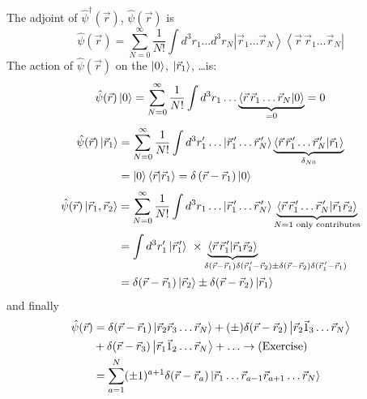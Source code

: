 \documentclass[12pt]{article}
\newcommand{\be}{\begin{equation}}
\newcommand{\ee}{\end{equation}}
\begin{document}
The adjoint of $\hat{\psi}^\dagger(\vec{r})$, $\hat{\psi}(\vec{r})$ is
\be
\hat{\psi}(\vec{r})=\sum_{N=0}^{\infty} \frac{1}{N !} \int d^{3} r_{1} \ldots d^{3} r_{N}\left|\vec{r}_{1} \ldots \vec{r}_{N}\right\rangle\left\langle\vec{r}\,\vec{r}_{1} \ldots \vec{r}_{N}\right|
\label{eq:g37}
\ee
The action of $\hat{\psi}(\vec{r})$ on the $\ket{0}$, $\ket{\vec{r}_1}$, \ldots is:
\be
\hat{\psi}(\vec{r})\ket{0} = \sum_{N=0}^{\infty} \frac{1}{N !} \int d^{3} r_{1}\ldots \underbrace{\bra{\vec{r}\,\vec{r}_1\ldots\vec{r}_N}\ket{0}}_{=0} = 0
\ee
%
\be
\begin{aligned}
\hat{\psi}(\vec{r})\ket{\vec{r}_1}
& =\sum_{N=0}^{\infty} \frac{1}{N !} \int d^{3} r_{1}^\prime\ldots
\ket{\vec{r}_1^{\,\prime}\ldots\vec{r}_N^{\,\prime}}
\underbrace{\bra{\vec{r}\,\vec{r}_1^{\,\prime}\ldots\vec{r}_N^{\,\prime}}\ket{\vec{r}_1}}_{\delta_{N0}}\\
&= \ket{0}\bra{\vec{r}}\ket{\vec{r}_1} = \delta\left(\vec{r}-\vec{r}_{1}\right)\ket{0}
\end{aligned}
\ee
\be
\begin{aligned}
\hat{\psi}(\vec{r})\ket{\vec{r}_1,\vec{r}_2}
& =\sum_{N=0}^{\infty} \frac{1}{N !} \int d^{3} r_{1}\ldots
\ket{\vec{r}_1^{\,\prime}\ldots\vec{r}_N^{\,\prime}}
\underbrace{\bra{\vec{r}\,\vec{r}_1^{\,\prime}\ldots\vec{r}_N^{\,\prime}}\ket{\vec{r}_1\vec{r}_2}}_{N=1\text{ only contributes}}\\
&= \int d^{3} r_{1}^\prime \ket{\vec{r}_1^{\,\prime}} \,\, \times
\underbrace{\bra{\vec{r}\,\vec{r}_1^{\,\prime}}\ket{\vec{r}_1\vec{r}_2}}%
_{\mathrlap{\delta(\vec{r}-\vec{r}_1)\delta(\vec{r}_1^{\,\prime}-\vec{r}_2) \pm \delta(\vec{r}-\vec{r}_2)\delta(\vec{r}_1^{\,\prime}-\vec{r}_1)}\hspace{5em}}\\
&= \delta(\vec{r}-\vec{r}_1)\ket{\vec{r}_2}\pm\delta(\vec{r}-\vec{r}_2)\ket{\vec{r}_1}
\end{aligned}
\label{eq:g40}
\ee
and finally
\be
\begin{aligned}
\hat{\psi}(\vec{r})
&=      \delta(\vec{r}-\vec{r}_1) \ket{\vec{r}_2\vec{r}_3\ldots\vec{r}_N}
+ (\pm) \delta(\vec{r}-\vec{r}_2) \ket{\vec{r}_2\vec{1}_3\ldots\vec{r}_N}\\
&+      \delta(\vec{r}-\vec{r}_3) \ket{\vec{r}_1\vec{1}_2\ldots\vec{r}_N} + \ldots\to
\text{(Exercise)}\\
&=\sum_{a=1}^N(\pm1)^{a+1}\delta(\vec{r}-\vec{r}_a)\ket{\vec{r}_1\ldots\vec{r}_{a-1}\vec{r}_{a+1}\ldots\vec{r}_N} 
\end{aligned}
\label{eq:g41}
\ee
\end{document}
